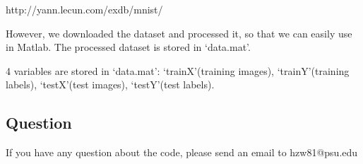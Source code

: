 \documentclass[a4paper]{article}
\begin{document}
http://yann.lecun.com/exdb/mnist/

However, we downloaded the dataset and processed it, so that we can easily use in Matlab. The processed dataset is stored in `data.mat'.


4 variables are stored in `data.mat': `trainX'(training images), `trainY'(training labels), `testX'(test images), `testY'(test labels).  

\subsection{Question}
If you have any question about the code, please send an email to hzw81@psu.edu
\end{document}
